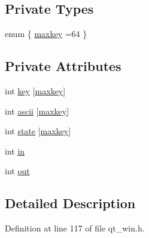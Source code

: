 \subsection*{Private Types}
\begin{DoxyCompactItemize}
\item 
enum \{ \hyperlink{classNetHackQtKeyBuffer_aba500b61e0b016b9456b9bd56189538da12c7054fca75617afb5c3b1f17a7c487}{maxkey} =64
 \}
\end{DoxyCompactItemize}
\subsection*{Private Attributes}
\begin{DoxyCompactItemize}
\item 
int \hyperlink{classNetHackQtKeyBuffer_a15eb3119d9d8df0f72185ede2277511e}{key} \mbox{[}\hyperlink{classNetHackQtKeyBuffer_aba500b61e0b016b9456b9bd56189538da12c7054fca75617afb5c3b1f17a7c487}{maxkey}\mbox{]}
\item 
int \hyperlink{classNetHackQtKeyBuffer_a6a287fcfb3c474749b3722fd6ea2804a}{ascii} \mbox{[}\hyperlink{classNetHackQtKeyBuffer_aba500b61e0b016b9456b9bd56189538da12c7054fca75617afb5c3b1f17a7c487}{maxkey}\mbox{]}
\item 
int \hyperlink{classNetHackQtKeyBuffer_a1e36092386de6ea377dac2fd8a08beba}{state} \mbox{[}\hyperlink{classNetHackQtKeyBuffer_aba500b61e0b016b9456b9bd56189538da12c7054fca75617afb5c3b1f17a7c487}{maxkey}\mbox{]}
\item 
int \hyperlink{classNetHackQtKeyBuffer_adeb9351d93b6f64ed6e70f9b382cd417}{in}
\item 
int \hyperlink{classNetHackQtKeyBuffer_a08e72debab7ef41fd34fc945fd980e0c}{out}
\end{DoxyCompactItemize}


\subsection{Detailed Description}


Definition at line 117 of file qt\+\_\+win.\+h.




